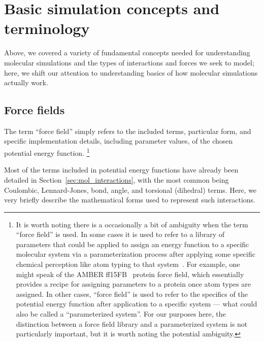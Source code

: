 \documentclass[9pt,bestpractices]{livecoms}
\begin{document}
\section{Basic simulation concepts and terminology}
\label{sec:basics}

Above, we covered a variety of fundamental concepts needed for understanding molecular simulations and the types of interactions and forces we seek to model; here, we shift our attention to understanding basics of how molecular simulations actually work.

\subsection{Force fields}
\label{sec:force_fields}

The term ``force field'' simply refers to the included terms, particular form, and specific implementation details, including parameter values, of the 
chosen potential energy function.
\footnote{It is worth noting there is a occasionally a bit of ambiguity when the term ``force field'' is used.
In some cases it is used to refer to a library of parameters that could be applied to assign an energy function to a specific molecular system via a parameterization process after applying some specific chemical perception like atom typing to that system~\citep{Mobley:2018:bioRxiv}.
For example, one might speak of the AMBER ff15FB~\citep{amber15FB} protein force field, which essentially provides a recipe for assigning parameters to a protein once atom types are assigned.
In other cases, ``force field'' is used to refer to the specifics of the potential energy function after application to a specific system --- what could also be called a ``parameterized system''. 
For our purposes here, the distinction between a force field library and a parameterized system is not particularly important, but it is worth noting the potential ambiguity. }

Most of the terms included in potential energy functions have already been detailed in Section~\ref{sec:mol_interactions}, with the most common being Coulombic, Lennard-Jones, bond, angle, and torsional (dihedral) terms. 
Here, we very briefly describe the mathematical forms used to represent such interactions.
\end{document}
